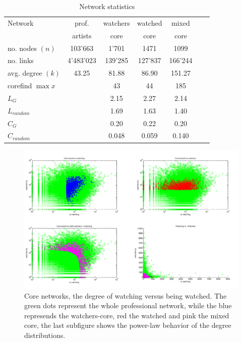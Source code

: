 \begin{table}[htb]
    \centering
    \begin{tabular}
        { | l | c | c | c | c | c | c|} 
        \hline
        Network &  prof.  & watchers & watched & mixed\\
	            &  artists & core & core & core \\
        \hline
	no. nodes $(n)$& 103'663 & 1'701 & 1471 & 1099 \\
	no. links & 4'483'023 & 139'285 & 127'837  & 166'244 \\
	avg. degree $(k)$& 43.25 & 81.88 & 86.90 & 151.27 \\
	corefind $\max x$ & & 43 & 44 & 185\\
	$L_G$ & & 2.15 & 2.27 & 2.14 \\
	$L_{random}$ & & 1.69 & 1.63 & 1.40 \\
	$C_G$ & & 0.20 & 0.22 & 0.20 \\
	$C_{random}$ & & 0.048 & 0.059 & 0.140 \\
	\hline
    \end{tabular}
    \caption{Network statistics}
    \label{tab:netstatistics}
\end{table}


\begin{figure}[htb]
  \centering
  \includegraphics[width=1\linewidth]{img/core.png}
  \caption{Core networks, the degree of watching versus being watched.  The green dots represent the whole professional network, while the blue represends the watchers-core, red the watched and pink the mixed core, the last subfigure shows the power-law behavior of the degree distributions.}
  \label{fig:results_core}
\end{figure}

